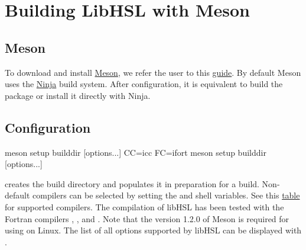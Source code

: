 \documentclass[gdweb]{geradwp}
\renewcommand{\_}{\raisebox{+0.35mm}{\textunderscore}}
\newcommand{\LibHSL}{LibHSL\xspace}
\begin{document}
\section{Building \LibHSL with Meson}

\subsection{Meson}

To download and install \href{https://mesonbuild.com}{Meson}, we refer the user to this \href{https://mesonbuild.com/SimpleStart.html}{guide}.
By default Meson uses the \href{https://ninja-build.org/}{Ninja} build system.
After configuration, it is equivalent to build the package or install it directly with Ninja.

\subsection{Configuration}

\begin{jllisting}
meson setup builddir [options...]
CC=icc FC=ifort meson setup builddir [options...]
\end{jllisting}
creates the build directory  and populates it in preparation for a build.
Non-default compilers can be selected by setting the  and  shell variables.
See this \href{https://mesonbuild.com/Reference-tables.html}{table} for supported compilers.
The compilation of libHSL has been tested with the Fortran compilers , ,  and .
Note that the version 1.2.0 of Meson is required for using  on Linux.
The list of all options supported by libHSL can be displayed with .
\end{document}
